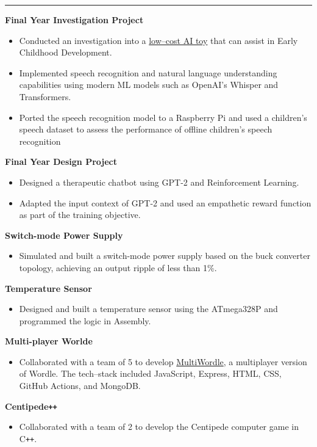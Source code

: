 \documentclass[10pt, a4paper]{article}
\newcommand{\heading}[1]{
\makebox[0pt][l]{\Large \sc \hspace{2pt}#1}
\rule[-0.7ex]{\columnwidth}{0.5pt}\vspace{1.0ex}
}
\newcommand{\subheading}[1]{{\bfseries #1}}
\newcommand{\subheadSkip}{\vspace{0.7ex}}
\newenvironment{mysection}[1]
{\vspace{2.5ex}
\heading{#1}
\begin{adjustwidth}{0.3cm}{0cm}}
{\end{adjustwidth} }
\begin{document}
\begin{mysection}{Projects}
    
 \subheading{Final Year Investigation Project}
         
     \begin{itemize}
     \item       Conducted an investigation into a \href{https://github.com/RyanSelesnik/AI-Toy}{low--cost AI toy} that can assist in Early Childhood Development. 

         \item Implemented speech recognition and natural language understanding capabilities using modern ML models such as OpenAI's Whisper and Transformers.
            \item Ported the speech recognition model to a Raspberry Pi and used a children's speech dataset to assess the performance of offline children's speech recognition
     \end{itemize} 
\subheadSkip   
 \subheading{Final Year Design Project} 
 \begin{itemize}
     \item Designed a therapeutic chatbot using GPT-2 and Reinforcement Learning.
     \item Adapted the input context of GPT-2 and used an empathetic reward function as part of the training objective.
 \end{itemize} 
 \subheadSkip
\subheading{Switch-mode Power Supply} 
\begin{itemize}
    \item Simulated and built a switch-mode power supply based on the buck converter topology, achieving an output ripple of less than 1\%.
\end{itemize}
 \subheadSkip
\subheading{Temperature Sensor} 
\begin{itemize}
    \item Designed and built a temperature sensor using the ATmega328P and programmed the logic in Assembly.
\end{itemize}
 \subheadSkip
\subheading{Multi-player Worlde} 
\begin{itemize}
    \item Collaborated with a team of 5 to develop \href{https://github.com/witseie-elen4010/2022-group-lab-001}{MultiWordle}, a multiplayer version of Wordle. The tech--stack included JavaScript, Express, HTML, CSS, GitHub Actions, and MongoDB. 
\end{itemize}
 \subheadSkip

\subheading{Centipede\texttt{++}} 
\begin{itemize}
    \item Collaborated with a team of 2 to develop the Centipede computer game in C\texttt{++}.
\end{itemize}


\end{mysection}
\end{document}
